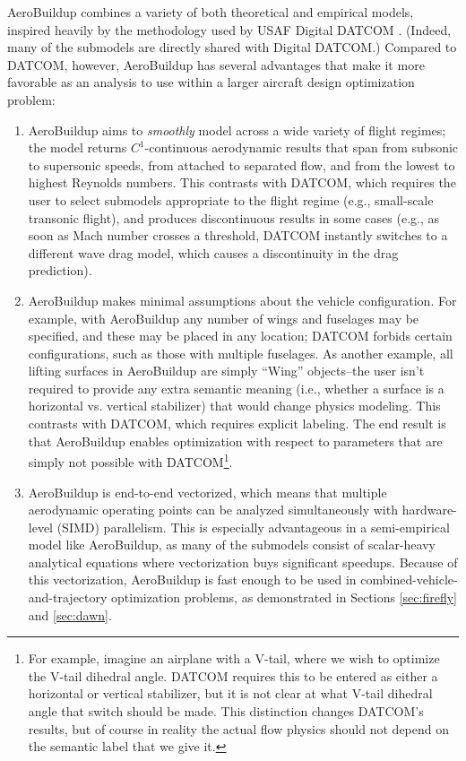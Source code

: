 AeroBuildup combines a variety of both theoretical and empirical models, inspired heavily by the methodology used by USAF Digital DATCOM \cite{datcom}. (Indeed, many of the submodels are directly shared with Digital DATCOM.) Compared to DATCOM, however, AeroBuildup has several advantages that make it more favorable as an analysis to use within a larger aircraft design optimization problem:

\begin{enumerate}
    \item AeroBuildup aims to \emph{smoothly} model across a wide variety of flight regimes; the model returns $C^1$-continuous aerodynamic results that span from subsonic to supersonic speeds, from attached to separated flow, and from the lowest to highest Reynolds numbers. This contrasts with DATCOM, which requires the user to select submodels appropriate to the flight regime (e.g., small-scale transonic flight), and produces discontinuous results in some cases (e.g., as soon as Mach number crosses a threshold, DATCOM instantly switches to a different wave drag model, which causes a discontinuity in the drag prediction).

    \item AeroBuildup makes minimal assumptions about the vehicle configuration. For example, with AeroBuildup any number of wings and fuselages may be specified, and these may be placed in any location; DATCOM forbids certain configurations, such as those with multiple fuselages. As another example, all lifting surfaces in AeroBuildup are simply ``Wing'' objects--the user isn't required to provide any extra semantic meaning (i.e., whether a surface is a horizontal vs. vertical stabilizer) that would change physics modeling. This contrasts with DATCOM, which requires explicit labeling. The end result is that AeroBuildup enables optimization with respect to parameters that are simply not possible with DATCOM\footnote{For example, imagine an airplane with a V-tail, where we wish to optimize the V-tail dihedral angle. DATCOM requires this to be entered as either a horizontal or vertical stabilizer, but it is not clear at what V-tail dihedral angle that switch should be made. This distinction changes DATCOM's results, but of course in reality the actual flow physics should not depend on the semantic label that we give it.}.

    \item AeroBuildup is end-to-end vectorized, which means that multiple aerodynamic operating points can be analyzed simultaneously with hardware-level (SIMD) parallelism. This is especially advantageous in a semi-empirical model like AeroBuildup, as many of the submodels consist of scalar-heavy analytical equations where vectorization buys significant speedups. Because of this vectorization, AeroBuildup is fast enough to be used in combined-vehicle-and-trajectory optimization problems, as demonstrated in Sections \ref{sec:firefly} and \ref{sec:dawn}.


\end{enumerate}
